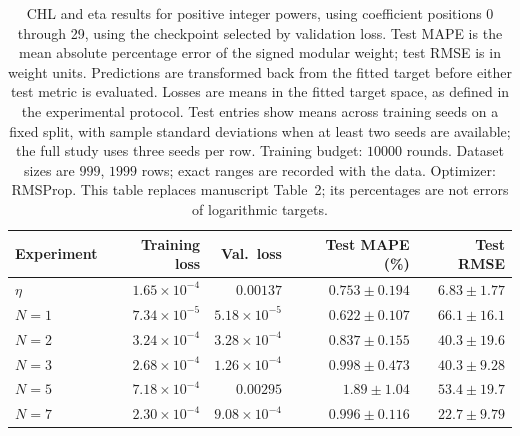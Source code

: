 \begin{table}[!htbp]
\centering
\small
\setlength{\tabcolsep}{4pt}
\renewcommand{\arraystretch}{1.18}
\begin{tabular}{@{}lrrrr@{}}
\toprule
Experiment & Training loss & Val.\ loss & Test MAPE (\%) & Test RMSE \\
\midrule
$\eta$ & $1.65\times10^{-4}$ & $0.00137$ & $0.753\pm0.194$ & $6.83\pm1.77$ \\
$N=1$ & $7.34\times10^{-5}$ & $5.18\times10^{-5}$ & $0.622\pm0.107$ & $66.1\pm16.1$ \\
$N=2$ & $3.24\times10^{-4}$ & $3.28\times10^{-4}$ & $0.837\pm0.155$ & $40.3\pm19.6$ \\
$N=3$ & $2.68\times10^{-4}$ & $1.26\times10^{-4}$ & $0.998\pm0.473$ & $40.3\pm9.28$ \\
$N=5$ & $7.18\times10^{-4}$ & $0.00295$ & $1.89\pm1.04$ & $53.4\pm19.7$ \\
$N=7$ & $2.30\times10^{-4}$ & $9.08\times10^{-4}$ & $0.996\pm0.116$ & $22.7\pm9.79$ \\
\bottomrule
\end{tabular}
\caption{\textsf{CHL and eta results for positive integer powers, using coefficient positions 0 through 29, using the checkpoint selected by validation loss. Test MAPE is the mean absolute percentage error of the signed modular weight; test RMSE is in weight units. Predictions are transformed back from the fitted target before either test metric is evaluated. Losses are means in the fitted target space, as defined in the experimental protocol. Test entries show means across training seeds on a fixed split, with sample standard deviations when at least two seeds are available; the full study uses three seeds per row. Training budget: $10000$ rounds. Dataset sizes are $999$, $1999$ rows; exact ranges are recorded with the data. Optimizer: RMSProp. This table replaces manuscript Table~2; its percentages are not errors of logarithmic targets.}}
\label{tab:chl-revised-2-best}
\end{table}
